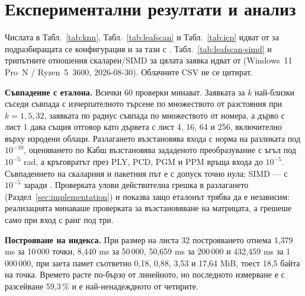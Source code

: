 \section{Експериментални резултати и анализ}
\label{sec:results}

Числата в Табл.~\ref{tab:knn}, Табл.~\ref{tab:leafscan} и Табл.~\ref{tab:icp} идват от
 за подразбиращата се конфигурация и
 за тази с . Табл.~\ref{tab:leafscan-simd}
и трипътните отношения скаларен/SIMD за цялата заявка идват от
 (Windows~11 Pro~N / Ryzen~5~3600, 2026-08-30).
Облачните CSV не се цитират.

\textbf{Съвпадение с еталона.} Всички 60 проверки минават. Заявката за $k$ най-близки съседи
съвпада с изчерпателното търсене по множеството от разстояния при $k = 1, 5, 32$, заявката по
радиус съвпада по множеството от номера, а дърво с лист 1 дава същия отговор като дървета с
лист 4, 16, 64 и 256, включително върху изродени облаци. Разлагането възстановява входа с норма
на разликата под $10^{-10}$, оценяването по Кабш възстановява зададеното преобразувание с ъгъл
под $10^{-5}$ rad, а кръговратът през PLY, PCD, PGM и PPM връща входа до $10^{-5}$. Съвпадението
на скаларния и пакетния път е с допуск точно нула; SIMD --- с $10^{-5}$ заради .
Проверката 
улови действителна грешка в разлагането (Раздел~\ref{sec:implementation}) и показва защо
еталонът трябва да е независим: реализацията минаваше проверката за възстановяване на матрицата,
а грешеше само при вход с ранг под три.

\textbf{Построяване на индекса.} При размер на листа 32 построяването отнема 1,379 ms за
10\,000 точки, 8,440 ms за 50\,000, 50,659 ms за 200\,000 и 432,459 ms за 1\,000\,000, при
заета памет съответно 0,18, 0,88, 3,53 и 17,64 MiB, тоест 18,5 байта на точка. Времето расте
по-бързо от линейното, но последното измерване е с разсейване 59,3\,\% и е най-ненадеждното от
четирите.

